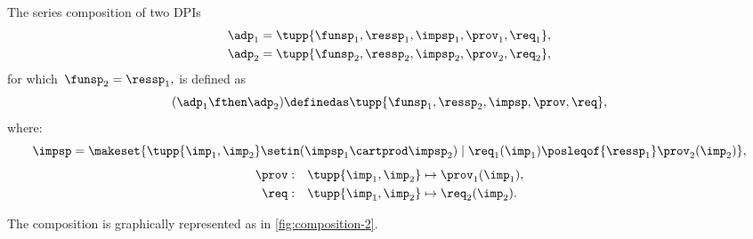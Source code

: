 \begin{definition}
    \label{def:series-composition}
    The series composition of two DPIs
    \begin{equation}
        \begin{aligned}
            \adp_{1} & =  \tupp{\funsp_{1},\ressp_{1},\impsp_{1},\prov_{1},\req_{1}}, \\
            \adp_{2} & =  \tupp{\funsp_{2},\ressp_{2},\impsp_{2},\prov_{2},\req_{2}},
        \end{aligned}
    \end{equation}
    for which~$\funsp_{2}=\ressp_{1},$ is defined as
    \begin{equation}
        (\adp_{1} \fthen \adp_{2})
        \definedas
        \tupp{ \funsp_{1},\ressp_{2},\impsp,\prov,\req},
    \end{equation}
    where:
    \begin{equation}
        \impsp  =  \makeset{
            \tupp {\imp_{1}, \imp_{2}} \setin (\impsp_{1} \cartprod \impsp_{2})\mid\req_{1}(\imp_{1})\posleqof{\ressp_{1}}\prov_{2}(\imp_{2})
        },
    \end{equation}
    \begin{equation}
        \begin{aligned}
            \prov & : & \tupp {\imp_{1}, \imp_{2}} & \mapsto\prov_{1}(\imp_{1}), \\
            \req  & : & \tupp {\imp_{1}, \imp_{2}} & \mapsto\req_{2}(\imp_{2}).
        \end{aligned}
    \end{equation}
\end{definition}

\begin{marginfigure}
    \centering
    \caption{}
    \label{fig:composition-2}
\end{marginfigure}

The composition is graphically represented as in \cref{fig:composition-2}.

